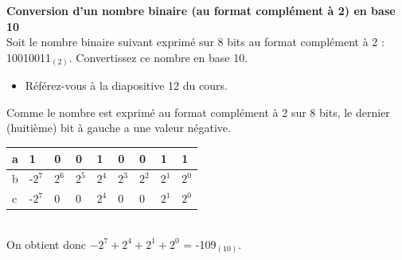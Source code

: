 \begin{Exercice}[5 minutes] \textbf{Conversion d'un nombre binaire (au format complément à 2) en base 10}\\
    
    Soit le nombre binaire suivant exprimé sur 8 bits au format complément à 2 : 10010011$_{(2)}$. Convertissez ce nombre en base 10. \\
	
    \begin{conseil}
    
    \begin{itemize}
    	\item Référez-vous à la diapositive 12 du cours. 
    \end{itemize}
    
    \end{conseil}
    
    \begin{solution}

       Comme le nombre est exprimé au format complément à 2 sur 8 bits, le dernier (huitième) bit à gauche a une valeur négative.  
       \\
       
       \begin{tabular}{| p{1cm} | p{1cm} | p{1cm} | p{1cm} | p{1cm} | p{1cm} | p{1cm} | p{1cm} | p{1cm} |} 
            \hline
            a & 1 & 0 & 0 & 1 & 0 & 0 & 1 & 1 \\  
            \hline
            b & -$2^7$ & $2^6$ & $2^5$ & $2^4$ & $2^3$ & $2^2$ & $2^1$ & $2^0$ \\ 
            \hline
            c & -$2^7$ & 0 & 0 & $2^4$ & 0 & 0 & $2^1$ & $2^0$ \\ 
            \hline
        \end{tabular} \\
        
        On obtient donc $-2^7 + 2^4 + 2^1 + 2^0$ = -109$_{(10)}$.
       
    \end{solution}
\end{Exercice}




   
